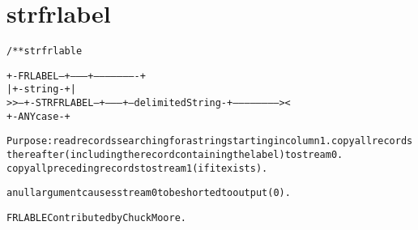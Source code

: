 \section{strfrlabel}
\begin{shaded}
\begin{alltt}
/** strfrlable

       +-FRLABEL--+--------+----------------------+
       |          +-string-+                      |
   >>--+-STRFRLABEL--+---------+--delimitedString-+-----------------------><
                     +-ANYcase-+

  Purpose: read records searching for a string starting in column 1. copy all records
           thereafter (including the record containing the label) to stream 0.
           copy all preceding records to stream 1 (if it exists).

           a null argument causes stream 0 to be shorted to output (0).

  FRLABLE Contributed by Chuck Moore.

\end{alltt}
\end{shaded}
